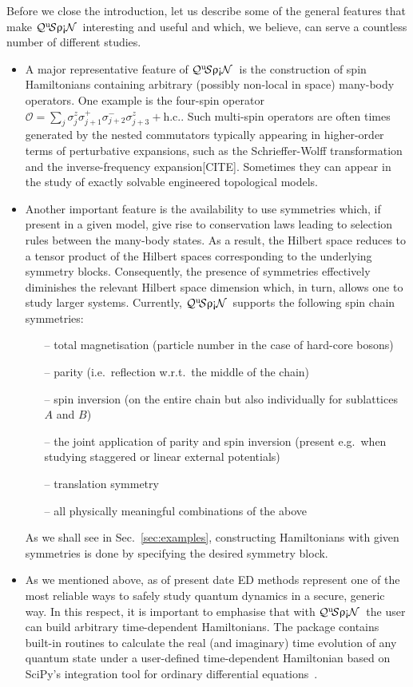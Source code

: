 \documentclass{SciPost}
\newcommand\0{\scalebox{-1}[1]{0}}
\newcommand{\qspin}{$\mathcal{Q}^{\mathrm{u}}\!\mathcal{S}\uprho\mathrm{\text{\textexclamdown}}\mathcal{N}$}
\begin{document}
Before we close the introduction, let us describe some of the general features that make \qspin\ interesting and useful and which, we believe, can serve a countless number of different studies. 
\begin{itemize}
	\item A major representative feature of \qspin\ is the construction of spin Hamiltonians containing arbitrary (possibly non-local in space) many-body operators. One example is the four-spin operator $\mathcal{O}= \sum_j \sigma^z_{j}\sigma^+_{j+1}\sigma^-_{j+2}\sigma^z_{j+3} + \mathrm{h.c.}$. Such multi-spin operators are often times generated by the nested commutators typically appearing in higher-order terms of perturbative expansions, such as the Schrieffer-Wolff transformation~\cite{bukov_SW} and the inverse-frequency expansion[CITE]. Sometimes they can appear in the study of exactly solvable engineered topological models. 
	\item Another important feature is the availability to use symmetries which, if present in a given model, give rise to conservation laws leading to selection rules between the many-body states. As a result, the Hilbert space reduces to a tensor product of the Hilbert spaces corresponding to the underlying symmetry blocks. Consequently, the presence of symmetries effectively diminishes the relevant Hilbert space dimension which, in turn, allows one to study larger systems. Currently, \qspin\ supports the following spin chain symmetries:
	\begin{itemize}
		\item[--] total magnetisation (particle number in the case of hard-core bosons)
		\item[--] parity (i.e.~reflection w.r.t.~the middle of the chain)
		\item[--] spin inversion (on the entire chain but also individually for sublattices $A$ and $B$)
		\item[--] the joint application of parity and spin inversion (present e.g.~when studying staggered or linear external potentials)
		\item[--] translation symmetry
		\item[--] all physically meaningful combinations of the above
	\end{itemize}
	 As we shall see in Sec.~\ref{sec:examples}, constructing Hamiltonians with given symmetries is done by specifying the desired symmetry block.
	\item As we mentioned above, as of present date ED methods represent one of the most reliable ways to safely study quantum dynamics in a secure, generic way. In this respect, it is important to emphasise that with \qspin\ the user can build arbitrary time-dependent Hamiltonians. The package contains built-in routines to calculate the real (and imaginary) time evolution of any quantum state under a user-defined time-dependent Hamiltonian based on SciPy's integration tool for ordinary differential equations~\cite{SciPy_package}.

\end{itemize}
\end{document}
